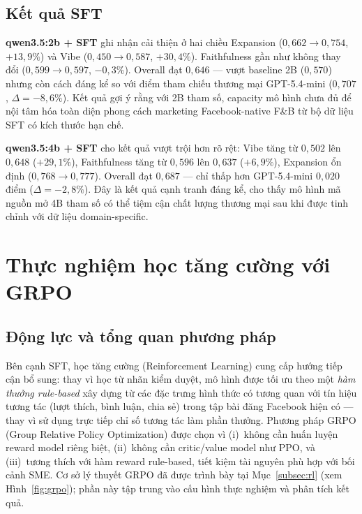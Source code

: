 \subsection{Kết quả SFT}

\textbf{qwen3.5:2b + SFT} ghi nhận cải thiện ở hai chiều Expansion
($0{,}662 \to 0{,}754$, $+13{,}9\%$) và Vibe ($0{,}450 \to 0{,}587$,
$+30{,}4\%$). Faithfulness gần như không thay đổi ($0{,}599 \to
0{,}597$, $-0{,}3\%$). Overall đạt $0{,}646$ --- vượt baseline 2B
($0{,}570$) nhưng còn cách đáng kể so với điểm tham chiếu thương mại
GPT-5.4-mini ($0{,}707$, $\Delta = -8{,}6\%$). Kết quả gợi ý rằng với
2B tham số, capacity mô hình chưa đủ để nội tâm hóa toàn diện phong
cách marketing Facebook-native F\&B từ bộ dữ liệu SFT có kích thước
hạn chế.

\textbf{qwen3.5:4b + SFT} cho kết quả vượt trội hơn rõ rệt: Vibe tăng
từ $0{,}502$ lên $0{,}648$ ($+29{,}1\%$), Faithfulness tăng từ $0{,}596$
lên $0{,}637$ ($+6{,}9\%$), Expansion ổn định ($0{,}768 \to 0{,}777$).
Overall đạt $0{,}687$ --- chỉ thấp hơn GPT-5.4-mini $0{,}020$ điểm
($\Delta = -2{,}8\%$). Đây là kết quả cạnh tranh đáng kể, cho thấy mô
hình mã nguồn mở 4B tham số có thể tiệm cận chất lượng thương mại sau
khi được tinh chỉnh với dữ liệu domain-specific.

\section{Thực nghiệm học tăng cường với GRPO}
\label{sec:grpo-result}

\subsection{Động lực và tổng quan phương pháp}

Bên cạnh SFT, học tăng cường (Reinforcement Learning) cung cấp hướng
tiếp cận bổ sung: thay vì học từ nhãn kiểm duyệt, mô hình được tối ưu
theo một \emph{hàm thưởng rule-based} xây dựng từ các đặc trưng hình
thức có tương quan với tín hiệu tương tác (lượt thích, bình luận, chia
sẻ) trong tập bài đăng Facebook hiện có --- thay vì sử dụng trực tiếp
chỉ số tương tác làm phần thưởng. Phương pháp GRPO (Group Relative
Policy Optimization) được chọn vì (i)~không cần huấn luyện reward
model riêng biệt, (ii)~không cần critic/value model như PPO, và
(iii)~tương thích với hàm reward rule-based, tiết kiệm tài nguyên phù
hợp với bối cảnh SME. Cơ sở lý thuyết GRPO đã được trình
bày tại Mục~\ref{subsec:rl} (xem Hình~\ref{fig:grpo}); phần này tập
trung vào cấu hình thực nghiệm và phân tích kết quả.

